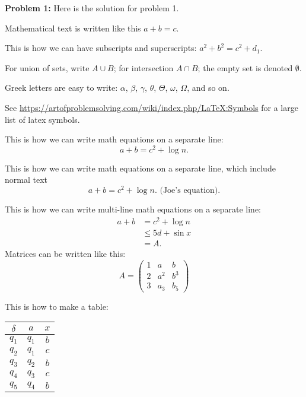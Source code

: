 \documentclass[12pt,letterpaper,final]{report}
\begin{document}
\vline


\noindent\textbf{Problem 1:}  Here is the solution for problem 1.

Mathematical text is written like this $a+b = c$.

This is how we can have subscripts and superscripts: $a^2 + b^2 = c^2 + d_1$.

For union of sets, write $A \cup B$; for intersection $A \cap B$; the empty set is denoted $\emptyset$.




Greek letters are easy to write: $\alpha$, $\beta$, $\gamma$, $\theta$, $\Theta$, $\omega$, $\Omega$, and so on. 

See \url{https://artofproblemsolving.com/wiki/index.php/LaTeX:Symbols} for a large list of latex symbols.

This is how we can write math equations on a separate line:
\[
a+b = c^2 + \log n. 
\]

This is how we can write math equations on a separate line, which include normal text
\[
a+b = c^2 + \log n. \mbox{    (Joe's equation).}
\]

This is how we can write multi-line math equations on a separate line:
\[
\begin{array}{ll}
a+b & = c^2 + \log n \\
&\leq 5d + \sin x \\
& = A.
\end{array}
\]
Matrices can be written like this:
\[
A = 
\begin{pmatrix}
1 & a & b \\
2 & a^2 & b^3 \\
3 & a_3 & b_5
\end{pmatrix}
\]
\bigskip

This is how to make a table:

\medskip

\begin{tabular}{|c|c|c|}
\hline
$\delta$ & $a$ & $x$ \\
\hline
$q_{1}$ & $q_{1}$ & $ b$ \\
$q_{2}$ & $q_{1}$ & $ c$ \\
$q_{3}$ & $q_{2}$ & $ b$ \\
$q_{4}$ & $q_{3}$ & $ c$ \\
$q_{5}$ & $q_{4}$ & $ b$ \\
\hline
\end{tabular}
\medskip
\end{document}
